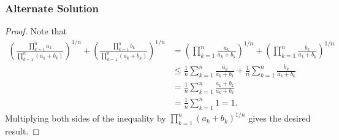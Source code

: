 \documentclass[11pt]{scrartcl}
\newcommand{\<}{\langle}
\renewcommand{\>}{\rangle}
\begin{document}
\subsubsection{Alternate Solution}
\begin{proof}
Note that 
\begin{align*}
\left (\frac{\prod_{k=1}^n a_k}{\prod_{k=1}^{n} (a_k + b_k)} \right)^{1/n} + \left (\frac{\prod_{k=1}^n b_k}{\prod_{k=1}^{n} (a_k + b_k)} \right)^{1/n} &= \left (\prod_{k=1}^n \frac{a_k}{a_k + b_k} \right)^{1/n} + \left (\prod_{k=1}^n \frac{b_k}{a_k + b_k} \right)^{1/n}  \\
&\le \frac{1}{n} \sum_{k=1}^n \frac{a_k}{a_k+b_k} + \frac{1}{n} \sum_{k=1}^n \frac{b_k}{a_k + b_k} \\
&= \frac{1}{n} \sum_{k=1}^n \frac{a_k + b_k}{a_k + b_k} \\
&= \frac{1}{n} \sum_{k=1}^n 1 = 1.  
\end{align*}
Multiplying both sides of the inequality by $\prod_{k=1}^n (a_k+b_k)^{1/n}$ gives the desired result.  
\end{proof}
\end{document}
